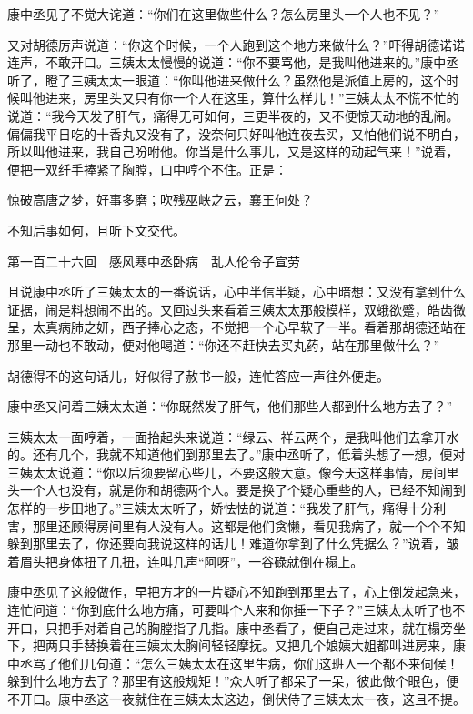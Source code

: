 \documentclass[12pt,UTF8]{ctexbook}
\begin{document}
{{{康中丞见了不觉大诧道：“你们在这里做些什么？怎么房里头一个人也不见？”

又对胡德厉声说道：“你这个时候，一个人跑到这个地方来做什么？”吓得胡德诺诺连声，不敢开口。三姨太太慢慢的说道：“你不要骂他，是我叫他进来的。”康中丞听了，瞪了三姨太太一眼道：“你叫他进来做什么？虽然他是派值上房的，这个时候叫他进来，房里头又只有你一个人在这里，算什么样儿！”三姨太太不慌不忙的说道：“我今天发了肝气，痛得无可如何，三更半夜的，又不便惊天动地的乱闹。偏偏我平日吃的十香丸又没有了，没奈何只好叫他连夜去买，又怕他们说不明白，所以叫他进来，我自己吩咐他。你当是什么事儿，又是这样的动起气来！”说着，便把一双纤手捧紧了胸膛，口中哼个不住。正是：

惊破高唐之梦，好事多磨；吹残巫峡之云，襄王何处？

不知后事如何，且听下文交代。





第一百二十六回　感风寒中丞卧病　乱人伦令子宣劳





且说康中丞听了三姨太太的一番说话，心中半信半疑，心中暗想：又没有拿到什么证据，闹是料想闹不出的。又回过头来看着三姨太太那般模样，双蛾欲蹙，皓齿微呈，太真病肺之妍，西子捧心之态，不觉把一个心早软了一半。看着那胡德还站在那里一动也不敢动，便对他喝道：“你还不赶快去买丸药，站在那里做什么？”

胡德得不的这句话儿，好似得了赦书一般，连忙答应一声往外便走。

康中丞又问着三姨太太道：“你既然发了肝气，他们那些人都到什么地方去了？”

三姨太太一面哼着，一面抬起头来说道：“绿云、祥云两个，是我叫他们去拿开水的。还有几个，我就不知道他们到那里去了。”康中丞听了，低着头想了一想，便对三姨太太说道：“你以后须要留心些儿，不要这般大意。像今天这样事情，房间里头一个人也没有，就是你和胡德两个人。要是换了个疑心重些的人，已经不知闹到怎样的一步田地了。”三姨太太听了，娇怯怯的说道：“我发了肝气，痛得十分利害，那里还顾得房间里有人没有人。这都是他们贪懒，看见我病了，就一个个不知躲到那里去了，你还要向我说这样的话儿！难道你拿到了什么凭据么？”说着，皱着眉头把身体扭了几扭，连叫几声“阿呀”，一谷碌就倒在榻上。

康中丞见了这般做作，早把方才的一片疑心不知跑到那里去了，心上倒发起急来，连忙问道：“你到底什么地方痛，可要叫个人来和你捶一下子？”三姨太太听了也不开口，只把手对着自己的胸膛指了几指。康中丞看了，便自己走过来，就在榻旁坐下，把两只手替换着在三姨太太胸间轻轻摩抚。又把几个娘姨大姐都叫进房来，康中丞骂了他们几句道：“怎么三姨太太在这里生病，你们这班人一个都不来伺候！躲到什么地方去了？那里有这般规矩！”众人听了都呆了一呆，彼此做个眼色，便不开口。康中丞这一夜就住在三姨太太这边，倒伏侍了三姨太太一夜，这且不提。

}}}
\end{document}
